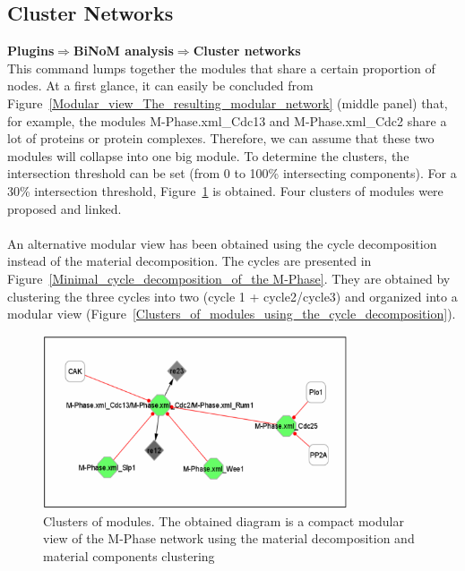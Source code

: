 \subsection{Cluster Networks}
\textbf{Plugins$\Rightarrow$BiNoM analysis$\Rightarrow$Cluster networks}\\
This command lumps together the modules that share a certain proportion of nodes. At a first glance, it can easily be concluded from Figure~\ref{Modular_view_The_resulting_modular_network} (middle panel) that, for example, the modules M-Phase.xml\_Cdc13 and M-Phase.xml\_Cdc2 share a lot of proteins or protein complexes. Therefore, we can assume that these two modules will collapse into one big module. To determine the clusters, the intersection threshold can be set (from 0 to 100\% intersecting components). For a 30\% intersection threshold, Figure~\ref{Clusters_of_modules_using_the_material_decomposition} is obtained. Four clusters of modules were proposed and linked.\\\\
An alternative modular view has been obtained using the cycle decomposition instead of the material decomposition. The cycles are presented in Figure~\ref{Minimal_cycle_decomposition_of_the M-Phase}. They are obtained by clustering the three cycles into two (cycle 1 + cycle2/cycle3) and organized into a modular view (Figure~\ref{Clusters_of_modules_using_the_cycle_decomposition}).\\
\begin{figure}
\centering
\includegraphics[width=0.8\textwidth]{graphics/Clusters_of_modules_using_the_material_decomposition}
\caption{Clusters of modules. The obtained diagram is a compact modular view of the M-Phase network using the material decomposition and material components clustering}
\label{Clusters_of_modules_using_the_material_decomposition}
\end{figure}
